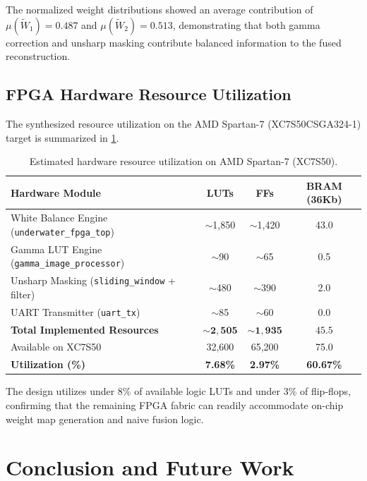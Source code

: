 \documentclass[10pt,twocolumn,letterpaper]{article}
\begin{document}
The normalized weight distributions showed an average contribution of $\mu(\tilde{W}_1) = 0.487$ and $\mu(\tilde{W}_2) = 0.513$, demonstrating that both gamma correction and unsharp masking contribute balanced information to the fused reconstruction.

\subsection{FPGA Hardware Resource Utilization}

The synthesized resource utilization on the AMD Spartan-7 (XC7S50CSGA324-1) target is summarized in \cref{tab:resource_spartan}.

\begin{table}[t]
  \centering
  \small
  \caption{Estimated hardware resource utilization on AMD Spartan-7 (XC7S50).}
  \label{tab:resource_spartan}
  \begin{tabular}{lccc}
    \toprule
    Hardware Module & LUTs & FFs & BRAM (36Kb) \\
    \midrule
    White Balance Engine (\texttt{underwater\_fpga\_top}) & $\sim$1,850 & $\sim$1,420 & 43.0 \\
    Gamma LUT Engine (\texttt{gamma\_image\_processor}) & $\sim$90 & $\sim$65 & 0.5 \\
    Unsharp Masking (\texttt{sliding\_window} + filter) & $\sim$480 & $\sim$390 & 2.0 \\
    UART Transmitter (\texttt{uart\_tx}) & $\sim$85 & $\sim$60 & 0.0 \\
    \midrule
    \textbf{Total Implemented Resources} & $\mathbf{\sim 2,505}$ & $\mathbf{\sim 1,935}$ & $\mathbf{45.5}$ \\
    Available on XC7S50 & 32,600 & 65,200 & 75.0 \\
    \textbf{Utilization (\%)} & \textbf{7.68\%} & \textbf{2.97\%} & \textbf{60.67\%} \\
    \bottomrule
  \end{tabular}
\end{table}

The design utilizes under 8\% of available logic LUTs and under 3\% of flip-flops, confirming that the remaining FPGA fabric can readily accommodate on-chip weight map generation and naive fusion logic.

\section{Conclusion and Future Work}
\label{sec:conclusion}
\end{document}

